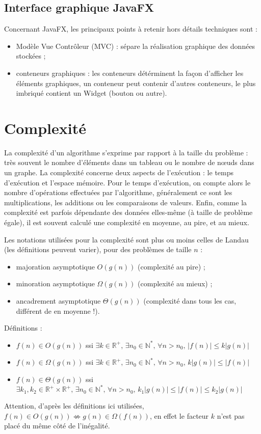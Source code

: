 \documentclass[10pt]{article}
\begin{document}
\subsection{Interface graphique JavaFX}

Concernant JavaFX, les principaux points à retenir hors détails techniques sont :
\begin{itemize}
\item Modèle Vue Contrôleur (MVC) : sépare la réalisation graphique des données stockées ;
\item conteneurs graphiques : les conteneurs détérminent la façon d'afficher les éléments graphiques, un conteneur
  peut contenir d'autres conteneurs, le plus imbriqué contient un Widget (bouton ou autre).
\end{itemize}

  
\section{Complexité}

La complexité d'un algorithme s'exprime par rapport à la taille du problème : très souvent le nombre d'éléments dans un tableau
ou le nombre de nœuds dans un graphe. La complexité concerne deux aspects de l'exécution : le temps d'exécution et l'espace mémoire.
Pour le temps d'exécution, on compte alors le nombre d'opérations effectuées par l'algorithme, généralement ce sont les multiplications,
les additions ou les comparaisons de valeurs. Enfin, comme la complexité est parfois dépendante des données elles-même (à taille de
problème égale), il est souvent calculé une complexité en moyenne, au pire, et au mieux.

Les notations utilisées pour la complexité sont plus ou moins celles de Landau (les définitions peuvent varier), pour des problèmes de taille $n$ :
\begin{itemize}
\item majoration asymptotique $O(g(n))$ (complexité au pire) ;
\item minoration asymptotique $\Omega(g(n))$ (complexité au mieux) ;
\item ancadrement asymptotique $\Theta(g(n))$ (complexité dans tous les cas, différent de en moyenne !).
\end{itemize}

Définitions :
\begin{itemize}
\item $f(n)\in O(g(n))$ ssi $\exists k \in \mathbb{R}^+,\,\exists n_0 \in \mathbb{N}^*, \,\forall n > n_0, \, |f(n)| \le k|g(n)|$
\item $f(n)\in \Omega(g(n))$ ssi $\exists k \in \mathbb{R}^+,\,\exists n_0 \in \mathbb{N}^*, \,\forall n > n_0, \, k|g(n)| \le |f(n)|$
\item $f(n)\in \Theta(g(n))$ ssi $\exists k_1,k_2 \in \mathbb{R}^+\times \mathbb{R}^+,\,\exists n_0 \in \mathbb{N}^*, \,\forall n > n_0, \, k_1|g(n)| \le |f(n)| \le k_2|g(n)|$
\end{itemize}
Attention, d'après les définitions ici utilisées, $f(n)\in O(g(n)) \nLeftrightarrow g(n)\in \Omega(f(n))$, en effet le facteur $k$ n'est pas placé du même
côté de l'inégalité.
\end{document}
